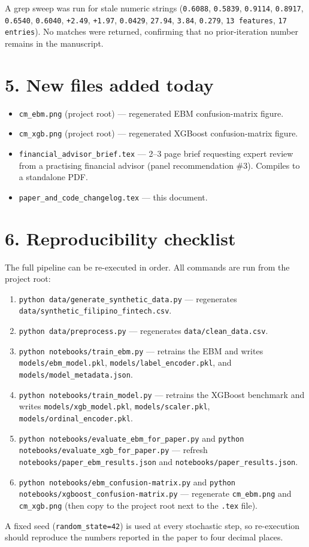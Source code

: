 \documentclass[11pt,a4paper]{article}
\begin{document}
A grep sweep was run for stale numeric strings (\texttt{0.6088},
\texttt{0.5839}, \texttt{0.9114}, \texttt{0.8917}, \texttt{0.6540},
\texttt{0.6040}, \texttt{+2.49}, \texttt{+1.97}, \texttt{0.0429},
\texttt{27.94}, \texttt{3.84}, \texttt{0.279}, \texttt{13 features},
\texttt{17 entries}). No matches were returned, confirming that no
prior-iteration number remains in the manuscript.

\section*{5. New files added today}

\begin{itemize}
    \item \texttt{cm\_ebm.png} (project root) --- regenerated EBM
    confusion-matrix figure.
    \item \texttt{cm\_xgb.png} (project root) --- regenerated XGBoost
    confusion-matrix figure.
    \item \texttt{financial\_advisor\_brief.tex} --- 2--3 page brief
    requesting expert review from a practising financial advisor (panel
    recommendation \#3). Compiles to a standalone PDF.
    \item \texttt{paper\_and\_code\_changelog.tex} --- this document.
\end{itemize}

\section*{6. Reproducibility checklist}

The full pipeline can be re-executed in order. All commands are run from
the project root:

\begin{enumerate}
    \item \texttt{python data/generate\_synthetic\_data.py}
    --- regenerates \texttt{data/synthetic\_filipino\_fintech.csv}.
    \item \texttt{python data/preprocess.py}
    --- regenerates \texttt{data/clean\_data.csv}.
    \item \texttt{python notebooks/train\_ebm.py}
    --- retrains the EBM and writes \texttt{models/ebm\_model.pkl},
    \texttt{models/label\_encoder.pkl}, and
    \texttt{models/model\_metadata.json}.
    \item \texttt{python notebooks/train\_model.py}
    --- retrains the XGBoost benchmark and writes
    \texttt{models/xgb\_model.pkl},
    \texttt{models/scaler.pkl}, \texttt{models/ordinal\_encoder.pkl}.
    \item \texttt{python notebooks/evaluate\_ebm\_for\_paper.py} and
    \texttt{python notebooks/evaluate\_xgb\_for\_paper.py}
    --- refresh \texttt{notebooks/paper\_ebm\_results.json} and
    \texttt{notebooks/paper\_results.json}.
    \item \texttt{python notebooks/ebm\_confusion-matrix.py} and
    \texttt{python notebooks/xgboost\_confusion-matrix.py}
    --- regenerate \texttt{cm\_ebm.png} and \texttt{cm\_xgb.png} (then
    copy to the project root next to the \texttt{.tex} file).
\end{enumerate}

A fixed seed (\texttt{random\_state=42}) is used at every stochastic
step, so re-execution should reproduce the numbers reported in the paper
to four decimal places.
\end{document}
